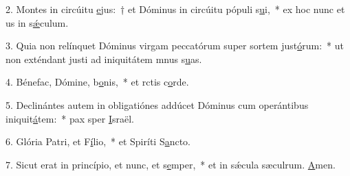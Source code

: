 2. Montes in circúitu \uline{e}jus:~† et Dóminus in circúitu pópuli s\uline{u}i,~* ex hoc nunc et us in s\uline{ǽ}culum.\par 
3. Quia non relínquet Dóminus virgam peccatórum super sortem just\uline{ó}rum:~* ut non exténdant justi ad iniquitátem mnus s\uline{u}as.\par 
4. Bénefac, Dómine, b\uline{o}nis,~* et rctis c\uline{o}rde.\par 
5. Declinántes autem in obligatiónes addúcet Dóminus cum operántibus iniquit\uline{á}tem:~* pax sper \uline{I}sraël.\par 
6. Glória Patri, et F\uline{í}lio,~* et Spiríti S\uline{a}ncto.\par 
7. Sicut erat in princípio, et nunc, et s\uline{e}mper,~* et in sǽcula sæculrum. \uline{A}men.\par 
